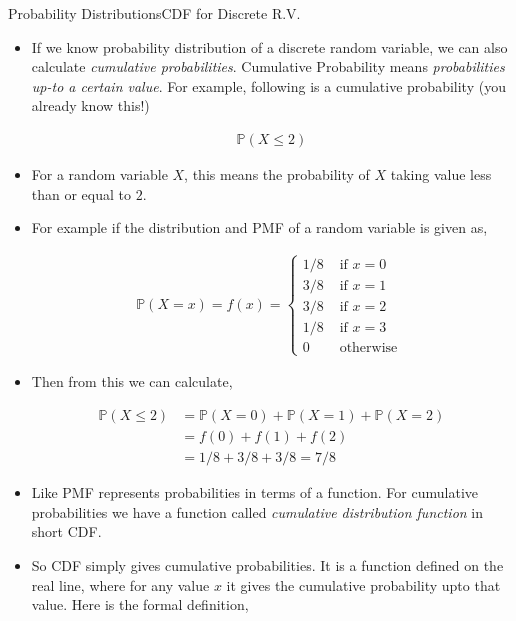 \documentclass[8pt, usepdftitle = false]{beamer}
\begin{document}
\begin{frame}[allowframebreaks]{Probability Distributions}{CDF for Discrete R.V.}

\begin{itemize}

\item If we know probability distribution of a discrete random variable, we can also calculate \emph{cumulative probabilities}. Cumulative Probability means \emph{probabilities up-to a certain value}. For example, following is a cumulative probability (you already know this!) 

\begin{align*}
	\mathbb{P}(X \leq 2)
\end{align*}

\item For a random variable $X$, this means \alert{the probability of $X$ taking value less than or equal to $2$}. 

\item For example if the distribution and PMF of a random variable is given as, 

\begin{align*}
\mathbb{P}(X = x) = f(x)= \begin{cases} 1/8 & \text { if } x=0 \\ 
3/8 & \text { if } x=1 \\ 
3/8 & \text { if } x=2 \\ 
1/8 & \text { if } x=3 \\ 
0 & \text { otherwise }\end{cases}
\end{align*}

\item Then from this we can calculate,

\begin{align*}
	\mathbb{P}(X \leq 2) &= \mathbb{P}(X = 0) + \mathbb{P}(X =1) + \mathbb{P}(X = 2)
	\\ &= f(0) + f(1) + f(2) \\
	&=1/8 + 3/8 + 3/8 = 7/8
\end{align*}

\framebreak


\item Like PMF represents probabilities in terms of a function. For cumulative probabilities we have a function called \emph{cumulative distribution function} in short CDF. 

\item So CDF simply gives cumulative probabilities. It is a function defined on the real line, where for any value $x$ it gives the cumulative probability upto that value. Here is the formal definition,


\end{itemize}
\end{frame}
\end{document}

